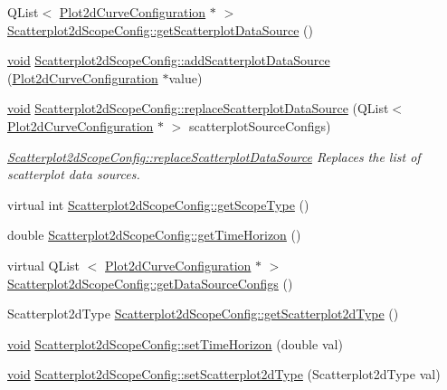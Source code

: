\begin{DoxyCompactItemize}
\item 
\-Q\-List$<$ \hyperlink{struct_plot2d_curve_configuration}{\-Plot2d\-Curve\-Configuration} $\ast$ $>$ \hyperlink{group___scope_plugin_ga56246d3456c2ccf8cc5a851d3fd956f4}{\-Scatterplot2d\-Scope\-Config\-::get\-Scatterplot\-Data\-Source} ()
\item 
\hyperlink{group___u_a_v_objects_plugin_ga444cf2ff3f0ecbe028adce838d373f5c}{void} \hyperlink{group___scope_plugin_gac77a97364a3c7dc1e41da11bd400c551}{\-Scatterplot2d\-Scope\-Config\-::add\-Scatterplot\-Data\-Source} (\hyperlink{struct_plot2d_curve_configuration}{\-Plot2d\-Curve\-Configuration} $\ast$value)
\item 
\hyperlink{group___u_a_v_objects_plugin_ga444cf2ff3f0ecbe028adce838d373f5c}{void} \hyperlink{group___scope_plugin_ga9fa344bf8a33a2d154be6922d8cc7915}{\-Scatterplot2d\-Scope\-Config\-::replace\-Scatterplot\-Data\-Source} (\-Q\-List$<$ \hyperlink{struct_plot2d_curve_configuration}{\-Plot2d\-Curve\-Configuration} $\ast$ $>$ scatterplot\-Source\-Configs)
\begin{DoxyCompactList}\small\item\em \hyperlink{group___scope_plugin_ga9fa344bf8a33a2d154be6922d8cc7915}{\-Scatterplot2d\-Scope\-Config\-::replace\-Scatterplot\-Data\-Source} \-Replaces the list of scatterplot data sources. \end{DoxyCompactList}\item 
virtual int \hyperlink{group___scope_plugin_gaca53d526ca13b2be6f8e11ea754929a7}{\-Scatterplot2d\-Scope\-Config\-::get\-Scope\-Type} ()
\item 
double \hyperlink{group___scope_plugin_ga66b9fcd762689ee3c5692552de87d7d1}{\-Scatterplot2d\-Scope\-Config\-::get\-Time\-Horizon} ()
\item 
virtual \-Q\-List\*
$<$ \hyperlink{struct_plot2d_curve_configuration}{\-Plot2d\-Curve\-Configuration} $\ast$ $>$ \hyperlink{group___scope_plugin_ga7ca2caad5fa0ed638d0681c5d3270241}{\-Scatterplot2d\-Scope\-Config\-::get\-Data\-Source\-Configs} ()
\item 
\-Scatterplot2d\-Type \hyperlink{group___scope_plugin_ga09fc23adf2e2a28804bcf775ea00057c}{\-Scatterplot2d\-Scope\-Config\-::get\-Scatterplot2d\-Type} ()
\item 
\hyperlink{group___u_a_v_objects_plugin_ga444cf2ff3f0ecbe028adce838d373f5c}{void} \hyperlink{group___scope_plugin_gaecbec1456088d121dbf2b9f63a45c6ab}{\-Scatterplot2d\-Scope\-Config\-::set\-Time\-Horizon} (double val)
\item 
\hyperlink{group___u_a_v_objects_plugin_ga444cf2ff3f0ecbe028adce838d373f5c}{void} \hyperlink{group___scope_plugin_ga67790b6de2598e4ff9f2d585fee11d09}{\-Scatterplot2d\-Scope\-Config\-::set\-Scatterplot2d\-Type} (\-Scatterplot2d\-Type val)

\end{DoxyCompactItemize}
